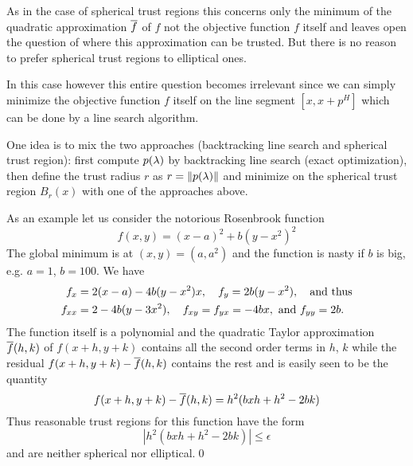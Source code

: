 As in the case of spherical trust regions this concerns only the minimum of the quadratic approximation
$\overline f$ of $f$ not the objective function $f$ itself and leaves open the question of where this approximation
can be trusted. But there is no reason to prefer spherical trust regions to elliptical ones.

In this case however this entire question becomes irrelevant since we can simply minimize the objective 
function $f$ itself on the line segment $[x,x+p^H]$ which can be done by a line search algorithm.

One idea is to mix the two approaches (backtracking line search and spherical trust region): first
compute $p(\lambda)$ by backtracking line search (exact optimization), then define the trust radius $r$
as $r=\left\|p(\lambda)\right\|$ and minimize on the spherical trust region $B_r(x)$ with one of the approaches 
above.

\begin{example}
\label{example:rosenbrook}
As an example let us consider the notorious Rosenbrook function
%
\begin{equation}
\label{rosenbrook_fn}
f(x,y)=(x-a)^2+b(y-x^2)^2
\end{equation}
%
The global minimum is at $(x,y)=(a,a^2)$ and the function is nasty if $b$ is big, e.g. $a=1$, $b=100$.
We have
%
\begin{align*}
f_x &= 2(x-a)-4b(y-x^2)x,\quad f_y=2b(y-x^2),\quad\text{and thus}\\
f_{xx} &= 2-4b(y-3x^2),\quad f_{xy}=f_{yx}=-4bx,\text{ and }f_{yy}=2b.
\end{align*}
%
The function itself is a polynomial and the quadratic Taylor approximation $\overline f(h,k)$ of $f(x+h,y+k)$ contains
all the second order terms in $h$, $k$ while the residual $f(x+h,y+k)-\overline f(h,k)$ contains the rest and is easily 
seen to be the quantity
$$
f(x+h,y+k)-\overline f(h,k) = h^2(bxh+h^2-2bk)
$$
Thus reasonable trust regions for this function have the form
$$
|h^2(bxh+h^2-2bk)|\leq\epsilon
$$
and are neither spherical nor elliptical.\qed
\end{example}
%




